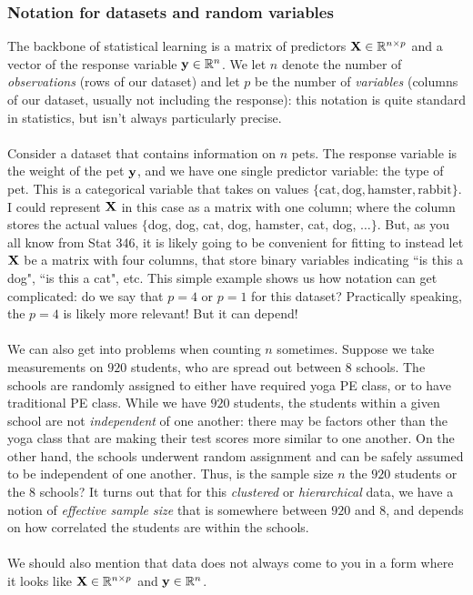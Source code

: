 \documentclass[titlepage,10pt]{scrartcl}
\begin{document}
\subsubsection{Notation for datasets and random variables}

The backbone of statistical learning is a matrix of predictors $\bold{X} \in \mathbb{R}^{n \times p}$ and a vector of the response variable $\bold{y} \in \mathbb{R}^n$. We let $n$ denote the number of \emph{observations} (rows of our dataset) and let $p$ be the number of \emph{variables} (columns of our dataset, usually not including the response): this notation is quite standard in statistics, but isn't always particularly precise. \\
\\
Consider a dataset that contains information on $n$ pets. The response variable is the weight of the pet $\bold{y}$, and we have one single predictor variable: the type of pet. This is a categorical variable that takes on values $\{ \text{cat}, \text{dog}, \text{hamster}, \text{rabbit} \}$. I could represent $\bold{X}$ in this case as a matrix with one column; where the column stores the actual values $\{$dog, dog, cat, dog, hamster, cat, dog, $\ldots \}$.  But, as you all know from Stat 346, it is likely going to be convenient for fitting to instead let $\bold{X}$ be a matrix with four columns, that store binary variables indicating ``is this a dog", ``is this a cat", etc. This simple example shows us how notation can get complicated: do we say that $p=4$ or $p=1$ for this dataset? Practically speaking, the $p=4$ is likely more relevant! But it can depend!  \\
\\
We can also get into problems when counting $n$ sometimes. Suppose we take measurements on $920$ students, who are spread out between $8$ schools. The schools are randomly assigned to either have required yoga PE class, or to have traditional PE class.  While we have $920$ students, the students within a given school are not \emph{independent} of one another: there may be factors other than the yoga class that are making their test scores more similar to one another. On the other hand, the schools underwent random assignment and can be safely assumed to be independent of one another. Thus, is the sample size $n$ the $920$ students or the $8$ schools? It turns out that for this \emph{clustered} or \emph{hierarchical} data, we have a notion of \emph{effective sample size} that is somewhere between $920$ and $8$, and depends on how correlated the students are within the schools. \\
\\
We should also mention that data does not always come to you in a form where it looks like $\bold{X} \in \mathbb{R}^{n \times p}$ and $\bold{y} \in \mathbb{R}^n$.  
\end{document}
